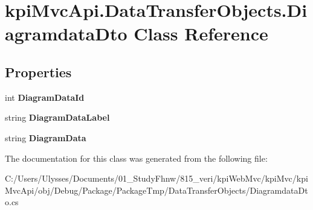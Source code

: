 \hypertarget{classkpi_mvc_api_1_1_data_transfer_objects_1_1_diagramdata_dto}{}\section{kpi\+Mvc\+Api.\+Data\+Transfer\+Objects.\+Diagramdata\+Dto Class Reference}
\label{classkpi_mvc_api_1_1_data_transfer_objects_1_1_diagramdata_dto}
\subsection*{Properties}
\begin{DoxyCompactItemize}
\item 
\mbox{\label{classkpi_mvc_api_1_1_data_transfer_objects_1_1_diagramdata_dto_a2f1c78c25410b5d89692f417c0099414}} 
int {\bfseries Diagram\+Data\+Id}
\item 
\mbox{\label{classkpi_mvc_api_1_1_data_transfer_objects_1_1_diagramdata_dto_a5cb8e04b29f5c657d4185b426eeb84da}} 
string {\bfseries Diagram\+Data\+Label}
\item 
\mbox{\label{classkpi_mvc_api_1_1_data_transfer_objects_1_1_diagramdata_dto_a4163112f5037d60673ac0d3ef3603fc8}} 
string {\bfseries Diagram\+Data}
\end{DoxyCompactItemize}


The documentation for this class was generated from the following file\+:\begin{DoxyCompactItemize}
\item 
C\+:/\+Users/\+Ulysses/\+Documents/01\+\_\+\+Study\+Fhnw/815\+\_\+veri/kpi\+Web\+Mvc/kpi\+Mvc/kpi\+Mvc\+Api/obj/\+Debug/\+Package/\+Package\+Tmp/\+Data\+Transfer\+Objects/Diagramdata\+Dto.\+cs\end{DoxyCompactItemize}
